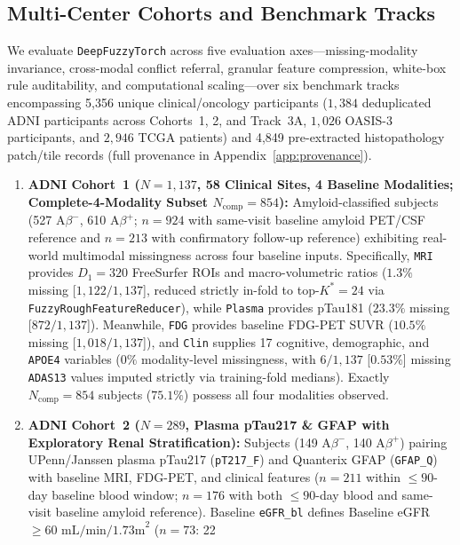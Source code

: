 \documentclass[10pt,twocolumn]{article}
\begin{document}
\subsection{Multi-Center Cohorts and Benchmark Tracks}
\label{sec:cohorts}
We evaluate \texttt{DeepFuzzyTorch} across five evaluation axes---missing-modality invariance,
cross-modal conflict referral, granular feature compression, white-box rule auditability, and
computational scaling---over six benchmark tracks encompassing 5,356 unique clinical/oncology
participants ($1,384$ deduplicated ADNI participants across Cohorts~1, 2, and Track~3A, $1,026$
OASIS-3 participants, and $2,946$ TCGA patients) and 4,849 pre-extracted histopathology
patch/tile records (full provenance in Appendix~\ref{app:provenance}).
\begin{enumerate}[leftmargin=1.4em,itemsep=1pt,topsep=2pt]
    \item \textbf{ADNI Cohort~1 ($N=1,137$, 58 Clinical Sites, 4 Baseline Modalities;
    Complete-4-Modality Subset $N_{\text{comp}}=854$):}
    Amyloid-classified subjects (527 A$\beta^-$, 610 A$\beta^+$; $n=924$ with same-visit
    baseline amyloid PET/CSF reference and $n=213$ with confirmatory follow-up reference)
    exhibiting real-world multimodal missingness across four baseline inputs. Specifically,
    \texttt{MRI} provides $D_1 = 320$ FreeSurfer ROIs and macro-volumetric ratios ($1.3\%$
    missing [$1,122/1,137$], reduced strictly in-fold to top-$K^*=24$ via
    \texttt{FuzzyRoughFeatureReducer}), while \texttt{Plasma} provides pTau181 ($23.3\%$
    missing [$872/1,137$]). Meanwhile, \texttt{FDG} provides baseline FDG-PET SUVR ($10.5\%$
    missing [$1,018/1,137$]), and \texttt{Clin} supplies 17 cognitive, demographic, and
    \texttt{APOE4} variables ($0\%$ modality-level missingness, with $6/1,137$ [$0.53\%$]
    missing \texttt{ADAS13} values imputed strictly via training-fold medians). Exactly
    $N_{\text{comp}}=854$ subjects ($75.1\%$) possess all four modalities observed.
    \item \textbf{ADNI Cohort~2 ($N=289$, Plasma pTau217 \& GFAP with Exploratory Renal
    Stratification):} Subjects (149 A$\beta^-$, 140 A$\beta^+$) pairing UPenn/Janssen plasma
    pTau217 (\texttt{pT217\_F}) and Quanterix GFAP (\texttt{GFAP\_Q}) with baseline MRI,
    FDG-PET, and clinical features ($n=211$ within $\le 90$-day baseline blood window; $n=176$
    with both $\le 90$-day blood and same-visit baseline amyloid reference). Baseline
    \texttt{eGFR\_bl} defines Baseline eGFR $\ge 60\text{ mL/min/1.73m}^2$ ($n=73$: 22

\end{enumerate}
\end{document}
